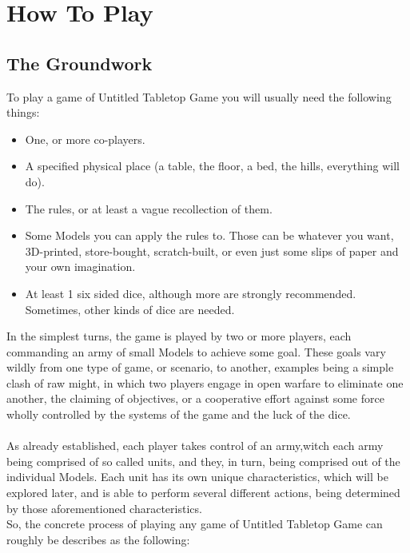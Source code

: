 \documentclass[a4paper,12pt]{report}
\begin{document}
\chapter{How To Play}

\section {The Groundwork}
To play a game of Untitled Tabletop Game you will usually need the following things:

\begin{adjustwidth}{-2cm}{-2cm}
\begin{multicols}{3}
\begin{itemize}

	\item One, or more co-players.
	\item A specified physical place (a table, the floor, a bed, the hills, everything will do).
	\item The rules, or at least a vague recollection of them.
	\item Some Models you can apply the rules to. Those can be whatever you want, 3D-printed, store-bought, scratch-built, or even just some slips of paper and your own imagination.
	\item At least 1 six sided dice, although more are strongly recommended. Sometimes, other kinds of dice are needed.
	
\end{itemize}
\end{multicols}
\end{adjustwidth}


In the simplest turns, the game is played by two or more  players, each commanding an army of small Models to achieve some goal. These goals vary wildly from one type of game, or scenario, to another, examples being a simple clash of raw might, in which two players engage in open warfare to eliminate one another, the claiming of objectives, or a cooperative effort against some force wholly controlled by the systems of the game and the luck of the dice.\\
\\

As already established, each player takes control of an army,witch each army being comprised of so called units, and they, in turn, being comprised out of the individual Models. Each unit has its own unique characteristics, which will be explored later, and is able to perform several different actions,  being determined by those aforementioned characteristics.\\
\newpage
So, the concrete process of playing any game of Untitled Tabletop Game can roughly be describes as the following:\\
\end{document}
